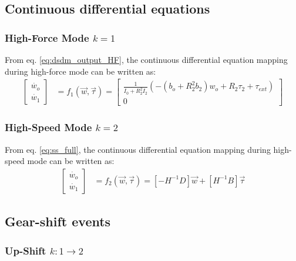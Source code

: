 
\subsection{Continuous differential equations}

\subsubsection{High-Force Mode $k=1$}

From eq. \eqref{eq:dsdm_output_HF}, the continuous differential equation mapping during high-force mode can be written as:
%
\begin{align}
\left[
\begin{array}{c}
\dot{w_o}\\
\dot{w_1}
\end{array}
\right] &= f_1( \vec{w} , \vec{\tau} ) = 
\left[ \begin{array}{c}
\frac{1}{I_0 + R^2_2 I_2}\left( -(b_o + R_2^2 b_2) w_o + R_2 \tau_2 + \tau_{ext} \right)\\
0
\end{array} \right]
\label{eq:f1}
\end{align}


\subsubsection{High-Speed Mode $k=2$}

From eq. \eqref{eq:ss_full}, the continuous differential equation mapping during high-speed mode can be written as:
%
\begin{align}
\left[
\begin{array}{c}
\dot{w_o}\\
\dot{w_1}
\end{array}
\right] &= f_2( \vec{w} , \vec{\tau} ) = 
\left[ -H^{-1} D \right]
\vec{w} 
+ 
\left[ H^{-1} B \right] 
\vec{\tau}
\label{eq:f2}
\end{align}


\subsection{Gear-shift events}

\subsubsection{Up-Shift $k:1\rightarrow2$}


